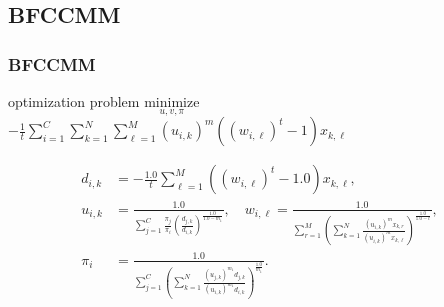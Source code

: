 \documentclass[fleqn,dvipdfmx,10pt]{beamer}
\begin{document}
\subsection{BFCCMM}
\begin{frame}\frametitle{BFCCMM}
  \begin{block}{optimization problem}
    $\underset{u,v,\pi}{\text{minimize}}$
    $-\frac{1}{t}\sum_{i=1}^C\sum_{k=1}^N\sum_{\ell=1}^M(u_{i,k})^m\left((w_{i,\ell})^t-1\right)x_{k,\ell}$
  \end{block}
  \begin{center}
    \begin{align*}
      d_{i,k}&=-\frac{1.0}{t}\sum_{\ell=1}^M\left((w_{i,\ell})^{t}-1.0\right)x_{k,\ell},\\
      u_{i,k}&=\frac{1.0}{\sum_{j=1}^C\frac{\pi_{j}}{\pi_{i}}\left(\frac{d_{j,k}}{d_{i,k}}\right)^\frac{1.0}{1.0-{m_1}}},\quad
      w_{i,\ell}=\frac{1.0}{\sum_{r=1}^M\left(\sum_{k=1}^N\frac{(u_{i,k})^m x_{k,r}}{(u_{i,k})^m x_{k,\ell}}\right)^{\frac{1.0}{1.0-t}}},\\
      \pi_{i}&=\frac{1.0}{\sum_{j=1}^C\left(\sum_{k=1}^N\frac{(u_{j,k})^{m_1}d_{j,k}}{(u_{i,k})^{m_1}d_{i,k}}\right)^{\frac{1.0}{m_1}}}.\\
    \end{align*}
  \end{center}
\end{frame}
\end{document}
